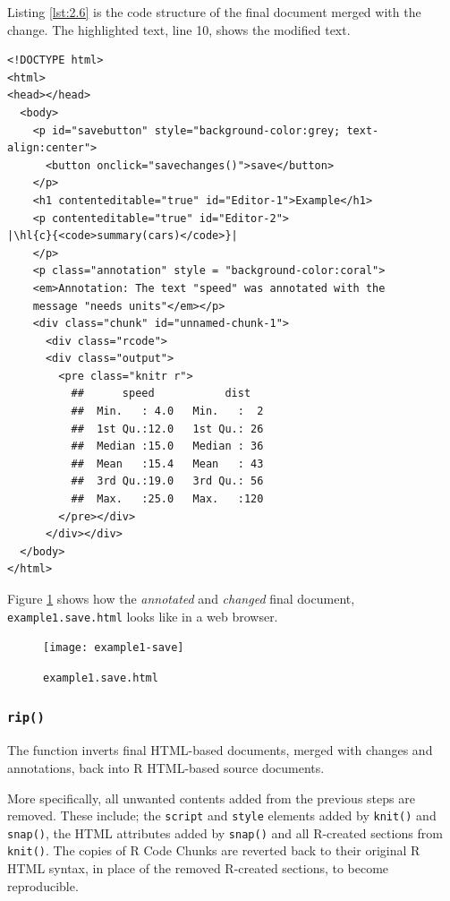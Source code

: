 \documentclass[a4paper, 12pt]{report}
\begin{document}
Listing \ref{lst:2.6} is the code structure of the final document merged with the change. The highlighted text, line 10, shows the modified text.
\begin{lstlisting}[caption={(tidied) \texttt{example1.save.html}}, escapechar=\|, label={lst:2.6}]
<!DOCTYPE html>
<html>
<head></head>
  <body>
    <p id="savebutton" style="background-color:grey; text-align:center">
      <button onclick="savechanges()">save</button>
    </p>
    <h1 contenteditable="true" id="Editor-1">Example</h1>
    <p contenteditable="true" id="Editor-2">
|\hl{c}{<code>summary(cars)</code>}|
    </p>
    <p class="annotation" style = "background-color:coral">
    <em>Annotation: The text "speed" was annotated with the
    message "needs units"</em></p>
    <div class="chunk" id="unnamed-chunk-1">
      <div class="rcode">
      <div class="output">
        <pre class="knitr r">
          ##      speed           dist    
          ##  Min.   : 4.0   Min.   :  2  
          ##  1st Qu.:12.0   1st Qu.: 26  
          ##  Median :15.0   Median : 36  
          ##  Mean   :15.4   Mean   : 43  
          ##  3rd Qu.:19.0   3rd Qu.: 56  
          ##  Max.   :25.0   Max.   :120
        </pre></div>
      </div></div>
  </body>
</html>
\end{lstlisting}

Figure \ref{fig:2.5} shows how the \emph{annotated} and \emph{changed} final document, \texttt{example1.save.html} looks like in a web browser.
\begin{figure}[h]
\texttt{[image: example1-save]}
\caption{\texttt{example1.save.html}}
\label{fig:2.5}
\end{figure}


\subsubsection*{\texttt{rip()}}
The function inverts final HTML-based documents, merged with changes and annotations, back into R HTML-based source documents.

More specifically, all unwanted contents added from the previous steps are removed. These include; the \texttt{script} and \texttt{style} elements added by \texttt{knit()} and \texttt{snap()}, the HTML attributes added by \texttt{snap()} and all R-created sections from \texttt{knit()}. The copies of R Code Chunks are reverted back to their original R HTML syntax, in place of the removed R-created sections, to become reproducible.
\end{document}
